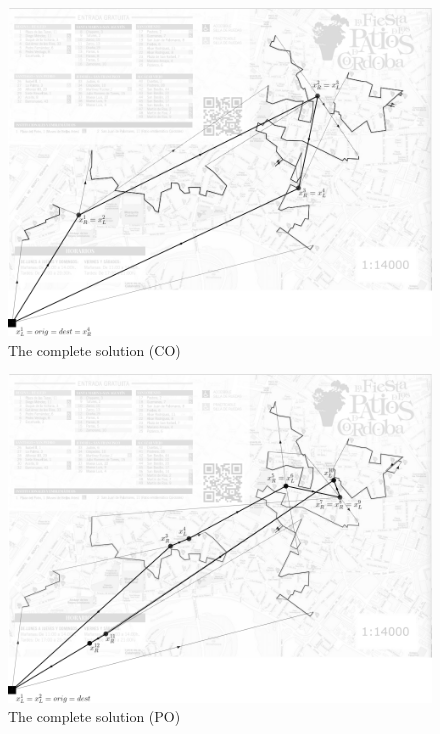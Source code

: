 \documentclass[10pt,a4paper]{elsarticle}
\begin{document}
\begin{figure}[h!]
	\centering
	\includegraphics[width=0.6\linewidth]{synchronous_2_gray.png}
	\caption{The complete solution (CO) \label{fig:tourD_CO}}
\end{figure}

\begin{figure}[h!]
	\centering
	\includegraphics[width=0.6\linewidth]{asynchronous_2_gray.png}
	\caption{The complete solution (PO) \label{fig:tourD_PO}}
\end{figure}
\end{document}
